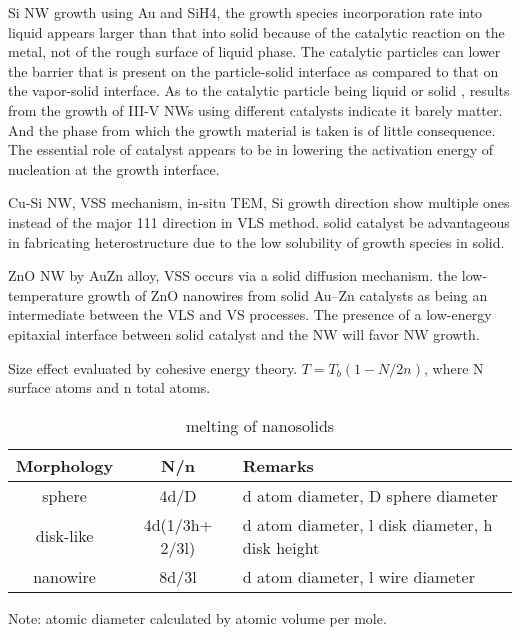 \cite{Cao2012a}

\cite{Shin2012}

\cite{Rathi2013}

Si NW growth using Au and SiH4, the growth species incorporation rate into liquid appears larger than that into solid because of the catalytic reaction on the metal, not of the rough surface of liquid phase. The catalytic particles can lower the barrier that is present on the particle-solid interface as compared to that on the vapor-solid interface. As to the catalytic particle being liquid \cite{Harmand2005, Park2006} or solid \cite{Dick2005,Persson2004}, results from the growth of III-V NWs using different catalysts indicate it barely matter. \cite{Kolasinski2006} And the phase from which the growth material is taken is of little consequence. The essential role of catalyst appears to be in lowering the activation energy of nucleation at the growth interface. 

Cu-Si NW, VSS mechanism, in-situ TEM, \cite{Wen2009} Si growth direction show multiple ones instead of the major 111 direction in VLS method. solid catalyst be advantageous in fabricating heterostructure due to the low solubility of growth species in solid. 

ZnO NW by AuZn alloy, VSS occurs via a solid diffusion mechanism.\cite{Campos2008} the low-temperature growth of ZnO nanowires from solid Au–Zn catalysts as being an intermediate between the VLS and VS processes. The presence of a low-energy epitaxial interface between solid catalyst and the NW will favor NW growth. 

Size effect evaluated by cohesive energy theory.\cite{Qi2005} $T = T_b (1 - N/2n)$, where N surface atoms and n total atoms.
 
\begin{table}[htb]
\centering
\caption{melting of nanosolids}\label{tab:nano}
\begin{tabular}{ccp{2in}}
\toprule
Morphology & N/n &  Remarks   \\
\midrule
sphere     &  4d/D  & d atom diameter, D sphere diameter   \\ 
disk-like     &  4d(1/3h+ 2/3l)  & d atom diameter, l disk diameter, h disk height \\ 
nanowire     &  8d/3l & d atom diameter, l wire diameter   \\ 
\bottomrule
\end{tabular}
Note: atomic diameter calculated by atomic volume per mole.
\end{table}

